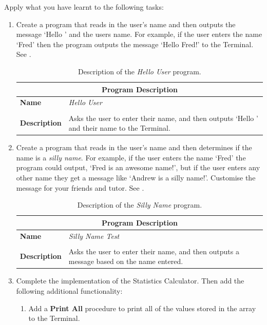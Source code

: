 Apply what you have learnt to the following tasks:
\begin{enumerate}
  \item Create a program that reads in the user's name and then outputs the message `Hello ' and the users name. For example, if the user enters the name `Fred' then the program outputs the message `Hello Fred!' to the Terminal. See .
  
  \begin{table}[h]
  \centering
  \begin{tabular}{l|p{12cm}}
    \hline
    \multicolumn{2}{c}{\textbf{Program Description}} \\
    \hline
    \textbf{Name} & \emph{Hello User} \\
    \\
    \textbf{Description} & Asks the user to enter their name, and then outputs `Hello ' and their name to the Terminal. \\
    \hline
  \end{tabular}
  \caption{Description of the \emph{Hello User} program.}
  \label{tbl:hello-user}
  \end{table}
  
  \item Create a program that reads in the user's name and then determines if the name is a \emph{silly name}. For example, if the user enters the name `Fred' the program could output, `Fred is an awesome name!', but if the user enters any other name they get a message like `Andrew is a silly name!'. Customise the message for your friends and tutor. See .

  \begin{table}[h]
  \centering
  \begin{tabular}{l|p{12cm}}
    \hline
    \multicolumn{2}{c}{\textbf{Program Description}} \\
    \hline
    \textbf{Name} & \emph{Silly Name Test} \\
    \\
    \textbf{Description} & Asks the user to enter their name, and then outputs a message based on the name entered. \\
    \hline
  \end{tabular}
  \caption{Description of the \emph{Silly Name} program.}
  \label{tbl:silly_name}
  \end{table}
  
  \clearpage
  \item Complete the implementation of the Statistics Calculator. Then add the following additional functionality:
  \begin{enumerate}
      \item Add a \textbf{Print All} procedure to print all of the values stored in the array to the Terminal.
      \begin{figure}[h]
      \end{figure}


\end{enumerate}
\end{enumerate}

